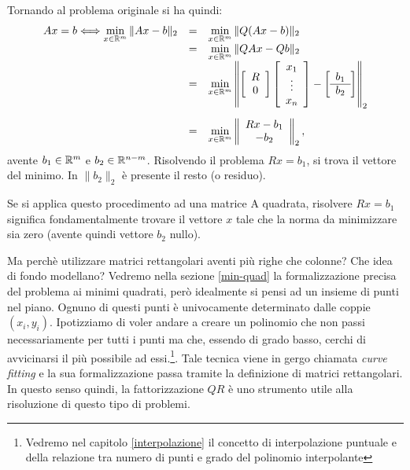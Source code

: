 Tornando al problema originale si ha quindi:
\[
\begin{array}{lcl}
Ax = b \Longleftrightarrow
\displaystyle \min_{x \in \mathbb{R}^m}\|Ax - b \|_2
& = & \displaystyle \min_{x \in \mathbb{R}^m}\|Q(Ax-b)\|_2 \\
& = & \displaystyle \min_{x \in \mathbb{R}^m}\|QAx - Qb\|_2 \\
& = & \displaystyle \min_{x \in \mathbb{R}^m}\left\|
\left[
\begin{array}{c}
R \\
0
\end{array}
\right]
\left[
\begin{array}{c}
x_1 \\
\vdots \\
x_n
\end{array}
\right] -
\left[
\begin{array}{c}
b_1 \\
\hline
b_2
\end{array}
\right]
\right \|_2 \\ [25 pt]
& = & \displaystyle \min_{x \in \mathbb{R}^m}\left\|
\begin{array}{c}
Rx -b_1 \\
-b_2
\end{array}
\right \|_2,

\end{array}
\]
avente $b_1 \in \mathbb{R}^m$ e $b_2 \in \mathbb{R}^{n-m}$. Risolvendo il problema $Rx = b_1$,
si trova il vettore del minimo. In $\|b_2\|_2$ è presente il resto (o residuo).

\begin{osse}
Se si applica questo procedimento ad una matrice A quadrata, risolvere $Rx = b_1$
significa fondamentalmente trovare il vettore $x$ tale che la norma da minimizzare
sia zero (avente quindi vettore $b_2$ nullo).
\end{osse}

Ma perchè utilizzare matrici rettangolari aventi più righe che colonne?
Che idea di fondo modellano? Vedremo nella sezione \ref{min-quad} la
formalizzazione precisa del problema ai minimi quadrati, però idealmente si
pensi ad un insieme di punti nel piano.
Ognuno di questi punti è univocamente determinato dalle coppie $(x_i,y_i)$.
Ipotizziamo di voler andare a creare un polinomio che non passi necessariamente
per tutti i punti ma che, essendo di grado basso, cerchi di avvicinarsi il più
possibile ad essi.\footnote{Vedremo nel capitolo \ref{interpolazione} il concetto di
interpolazione puntuale e della relazione tra numero di punti e grado del polinomio
interpolante}.
Tale tecnica viene in gergo chiamata \emph{curve fitting} e la sua formalizzazione
passa tramite la definizione di matrici rettangolari. In questo senso quindi,
la fattorizzazione $QR$ è uno strumento utile alla risoluzione di questo tipo di
problemi.


